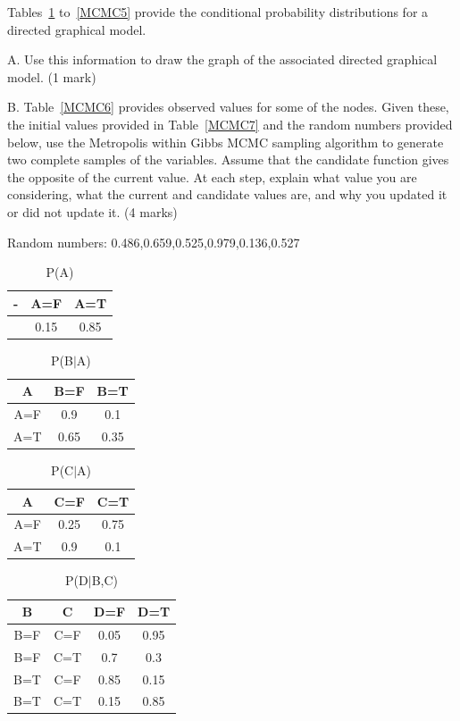 \documentclass{article}
\begin{document}
Tables~\ref{MCMC1} to~\ref{MCMC5} provide the conditional probability distributions for a directed graphical model.

A. Use this information to draw the graph of the associated directed graphical model. (1 mark)

B. Table~\ref{MCMC6} provides observed values for some of the nodes. Given these, the initial values provided in Table~\ref{MCMC7} and the random numbers provided below, use the Metropolis within Gibbs MCMC sampling algorithm to generate two complete samples of the variables. Assume that the candidate function gives the opposite of the current value. At each step, explain what value you are considering, what the current and candidate values are, and why you updated it or did not update it. (4 marks)

Random numbers: 0.486,0.659,0.525,0.979,0.136,0.527 
\begin{table}[h!]
\caption{P(A)}
\label{MCMC1}
\begin{center}
\begin{tabular}{ |c||c|c| } 
\hline
 - & A=F & A=T\\
\hline
 & 0.15 & 0.85\\
\hline
\end{tabular}
\end{center}
\end{table}
\begin{table}[h!]
\caption{P(B$|$A)}
\label{MCMC2}
\begin{center}
\begin{tabular}{ |c||c|c| } 
\hline
 A & B=F & B=T\\
\hline
 A=F & 0.9 & 0.1\\
 A=T & 0.65 & 0.35\\
\hline
\end{tabular}
\end{center}
\end{table}
\begin{table}[h!]
\caption{P(C$|$A)}
\label{MCMC3}
\begin{center}
\begin{tabular}{ |c||c|c| } 
\hline
 A & C=F & C=T\\
\hline
 A=F & 0.25 & 0.75\\
 A=T & 0.9 & 0.1\\
\hline
\end{tabular}
\end{center}
\end{table}
\begin{table}[h!]
\caption{P(D$|$B,C)}
\label{MCMC4}
\begin{center}
\begin{tabular}{ |c|c||c|c| } 
\hline
 B & C & D=F & D=T\\
\hline
 B=F & C=F & 0.05 & 0.95\\
 B=F & C=T & 0.7 & 0.3\\
 B=T & C=F & 0.85 & 0.15\\
 B=T & C=T & 0.15 & 0.85\\
\hline
\end{tabular}
\end{center}
\end{table}
\end{document}
